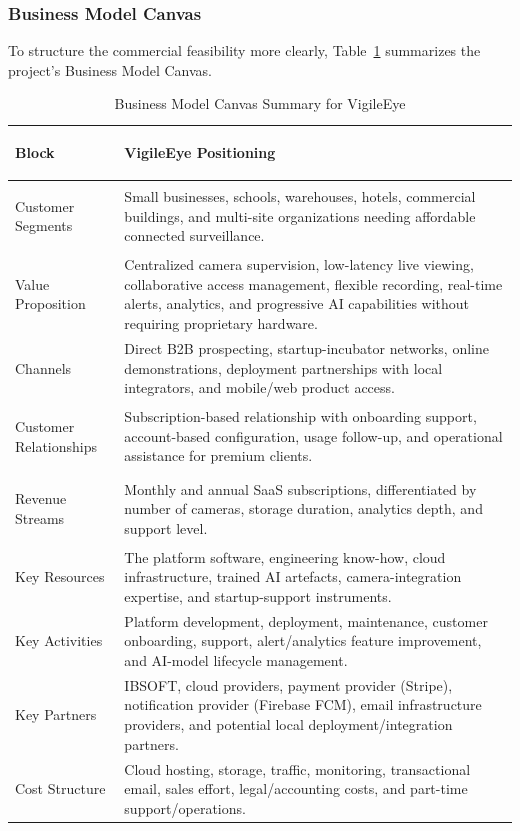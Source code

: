 \documentclass[12pt,a4paper,oneside]{report}
\begin{document}
\enlargethispage{6\baselineskip}
\subsubsection{Business Model Canvas}
\hspace{0.8cm}To structure the commercial feasibility more clearly, Table~\ref{tab:bmc_vigileeye} summarizes the project's Business Model Canvas.

\begin{table}[H]
\centering
\small
\begin{tabularx}{\textwidth}{|>{\bfseries\raggedright\arraybackslash}p{}|>{\raggedright\arraybackslash}X|}
\hline
\textbf{Block} & \textbf{VigileEye Positioning} \\
\hline
Customer Segments & Small businesses, schools, warehouses, hotels, commercial buildings, and multi-site organizations needing affordable connected surveillance. \\ \hline
Value Proposition & Centralized camera supervision, low-latency live viewing, collaborative access management, flexible recording, real-time alerts, analytics, and progressive AI capabilities without requiring proprietary hardware. \\ \hline
Channels & Direct B2B prospecting, startup-incubator networks, online demonstrations, deployment partnerships with local integrators, and mobile/web product access. \\ \hline
Customer Relationships & Subscription-based relationship with onboarding support, account-based configuration, usage follow-up, and operational assistance for premium clients. \\ \hline
Revenue Streams & Monthly and annual SaaS subscriptions, differentiated by number of cameras, storage duration, analytics depth, and support level. \\ \hline
Key Resources & The platform software, engineering know-how, cloud infrastructure, trained AI artefacts, camera-integration expertise, and startup-support instruments. \\ \hline
Key Activities & Platform development, deployment, maintenance, customer onboarding, support, alert/analytics feature improvement, and AI-model lifecycle management. \\ \hline
Key Partners & IBSOFT, cloud providers, payment provider (Stripe), notification provider (Firebase FCM), email infrastructure providers, and potential local deployment/integration partners. \\ \hline
Cost Structure & Cloud hosting, storage, traffic, monitoring, transactional email, sales effort, legal/accounting costs, and part-time support/operations. \\ \hline
\end{tabularx}
\caption{Business Model Canvas Summary for VigileEye}
\label{tab:bmc_vigileeye}
\end{table}
\end{document}
